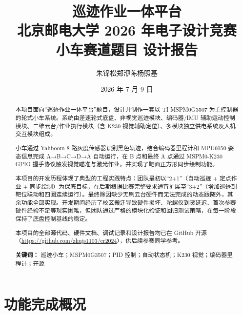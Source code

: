 \documentclass[12pt,a4paper]{ctexart}
\title{{\Huge\bfseries 巡迹作业一体平台}\\[0.5cm]
       {\large 北京邮电大学 2026 年电子设计竞赛\\小车赛道题目 设计报告}}
\author{朱锦松\quad 郑洢陈\quad 杨照基}
\date{2026 年 7 月 9 日}
\begin{document}
\maketitle
\thispagestyle{empty}

\newpage
\setcounter{page}{1}

\begin{abstract}
\noindent
本项目面向“巡迹作业一体平台”题目，设计并制作一套以 TI MSPM0G3507 为主控制器的轮式小车系统。系统由差速轮式底盘、非视觉巡迹模块、编码器/IMU 辅助运动控制模块、二维云台/作业执行模块（含 K230 视觉辅助定位）、多模块独立供电系统及人机交互模块组成。

小车通过 Yahboom 8 路灰度传感器识别黑色轨迹，结合编码器里程计和 MPU6050 姿态信息完成 A→B→C→D→A 自动运行，在 B 点和最终 A 点通过 MSPM0-K230 GPIO 握手协议触发视觉瞄准与激光作业，并实现了靶面正方形同步绘制功能。

本项目的开发历程体现了典型的工程实践特点：团队最初以“2+1”（自动巡迹 + 定点作业 + 同步绘制）为保底目标，在后期根据比赛完整要求通宵扩展至“3+2”（增加巡迹到靶位联动和四圈连续运行）。最终除因缺少无刷云台硬件而无法完成的动态跟随外，其余功能全部实现。开发期间经历了校区搬迁导致硬件损坏、陀螺仪到货延迟、首次参赛硬件经验不足等现实困难，但团队通过严格的模块化验证和回归测试策略，在每一阶段保持了底盘控制基线的稳定。

本项目的全部源代码、硬件文档、调试记录和设计报告均已在 GitHub 开源（\url{https://github.com/zhujs1103/er2024}），供后续参赛同学参考。

\vspace{1em}
\noindent\textbf{关键词：} 巡迹小车；MSPM0G3507；PID 控制；自动状态机；K230 视觉；编码器里程计；开源
\end{abstract}

\newpage
\tableofcontents
\newpage

\section*{功能完成概况}
\end{document}
